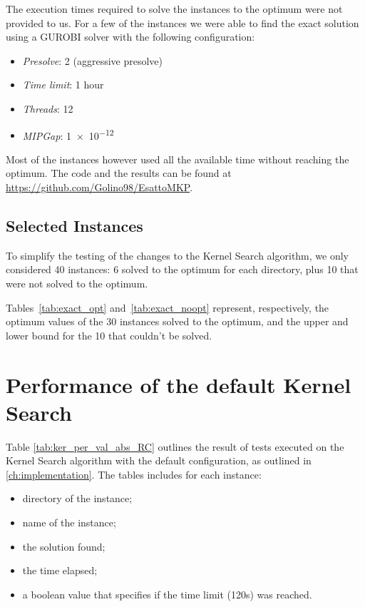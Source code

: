 The execution times required to solve the instances to the optimum were not provided to us.
For a few of the instances we were able to find the exact solution
using a GUROBI solver with the following configuration:

\begin{itemize}
    \item \textit{Presolve}: 2 (aggressive presolve)
    \item \textit{Time limit}: 1 hour
    \item \textit{Threads}: 12
    \item \textit{MIPGap}: \num{1e-12}
\end{itemize}

Most of the instances however used all the available time without reaching the optimum.
The code and the results can be found at \url{https://github.com/Golino98/EsattoMKP}.

\subsection{Selected Instances}\label{subsec:inst}
To simplify the testing of the changes to the Kernel Search algorithm,
we only considered 40 instances: 6 solved to the optimum for each directory,
plus 10 that were not solved to the optimum.

Tables~\ref{tab:exact_opt} and~\ref{tab:exact_noopt} represent,
respectively, the optimum values of the 30 instances solved to
the optimum, and the upper and lower bound for the 10
that couldn't be solved.




\section{Performance of the default Kernel Search}
Table \ref{tab:ker_per_val_abs_RC} outlines the result of tests executed on
the Kernel Search algorithm with the default configuration,
as outlined in \ref{ch:implementation}.
The tables includes for each instance:
\begin{itemize}
    \item directory of the instance;
    \item name of the instance;
    \item the solution found;
    \item the time elapsed;
    \item a boolean value that specifies if the time limit (120s) was reached.
\end{itemize}
